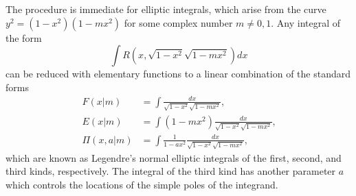 \documentclass[12pt,reqno]{amsart}
\numberwithin{equation}{section}
\begin{document}
The procedure is immediate for elliptic integrals, which arise from the curve $y^2 = (1-x^2)(1-m x^2)$ for some complex number $m \ne 0,1$. Any integral of the form
\begin{equation*}
\int R(x,\sqrt{1-x^2} \sqrt{1-m x^2}) dx 
\end{equation*}
can be reduced with elementary functions to a linear combination of the standard forms
\begin{align*}
F(x|m) &= \int \frac{dx}{\sqrt{1-x^2} \sqrt{1-m x^2}}\text{,}\\
E(x|m) &= \int (1-m x^2) \frac{dx}{\sqrt{1-x^2}\sqrt{1-m x^2}} \text{,}\\
\Pi(x,a|m) &= \int \frac{1}{1-a x^2} \frac{dx}{\sqrt{1-x^2}\sqrt{1-m x^2}}\text{,}
\end{align*}
which are known as Legendre's normal elliptic integrals of the first, second, and third kinds, respectively. The integral of the third kind has another parameter $a$ which controls the locations of the simple poles of the integrand.
\end{document}
